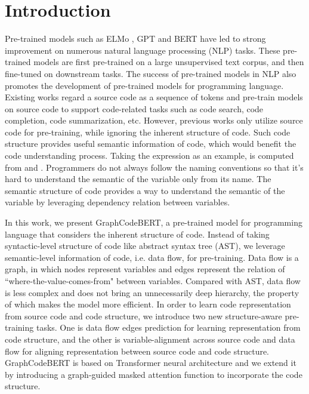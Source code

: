 \documentclass{article} \usepackage{iclr2021_conference,times}
\begin{document}
\section{Introduction}
Pre-trained models such as ELMo \citep{peters2018deep}, GPT \citep{radford2018improving} and BERT \citep{devlin2018bert} have led to strong improvement on numerous natural language processing (NLP) tasks.  These pre-trained models are first pre-trained on a large unsupervised text corpus, and then fine-tuned on downstream tasks.
The success of pre-trained models in NLP also promotes the development of pre-trained models for programming language.
Existing works \citep{kanade2019pre,karampatsis2020scelmo,feng2020codebert,svyatkovskiy2020intellicode,buratti2020exploring} regard a source code as a sequence of tokens and pre-train models on source code to support code-related tasks such as code search, code completion, code summarization, etc. 
However, previous works only utilize source code for pre-training, while ignoring the inherent structure of code. Such code structure provides useful semantic information of code, which would benefit the code understanding process.
Taking the expression {} as an example,  is computed from  and . Programmers do not always follow the naming conventions so that it's hard to understand the semantic of the variable  only from its name. The semantic structure of code provides a way to understand the semantic of the variable  by leveraging dependency relation between variables. 

In this work, we present GraphCodeBERT, a pre-trained model for programming language that considers the inherent structure of code. Instead of taking syntactic-level structure of code like abstract syntax tree (AST), we leverage semantic-level information of code, i.e. data flow, for pre-training. Data flow is a graph, in which nodes represent variables and edges represent the relation of ``where-the-value-comes-from" between variables. 
Compared with AST, data flow is less complex and does not bring an unnecessarily deep hierarchy, the property of which makes the model more efficient.
In order to learn code representation from source code and code structure, we introduce two new structure-aware pre-training tasks. One is data flow edges prediction for learning representation from code structure, and the other is variable-alignment across source code and data flow for aligning representation between source code and code structure.
GraphCodeBERT is based on Transformer neural architecture \citep{vaswani2017attention} and we extend it by introducing a graph-guided masked attention function to incorporate the code structure.
\end{document}
